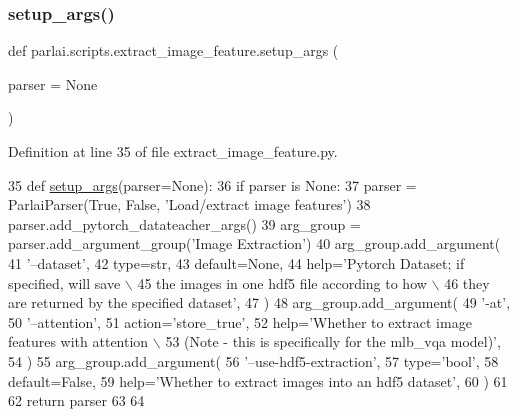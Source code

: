\subsubsection{\texorpdfstring{setup\+\_\+args()}{setup\_args()}}
{\footnotesize\ttfamily def parlai.\+scripts.\+extract\+\_\+image\+\_\+feature.\+setup\+\_\+args (\begin{DoxyParamCaption}\item[{}]{parser = {\ttfamily None} }\end{DoxyParamCaption})}



Definition at line 35 of file extract\+\_\+image\+\_\+feature.\+py.


\begin{DoxyCode}
35 \textcolor{keyword}{def }\hyperlink{namespaceparlai_1_1scripts_1_1extract__image__feature_ab634fcc65758e30deaf92980edcc20bd}{setup\_args}(parser=None):
36     \textcolor{keywordflow}{if} parser \textcolor{keywordflow}{is} \textcolor{keywordtype}{None}:
37         parser = ParlaiParser(\textcolor{keyword}{True}, \textcolor{keyword}{False}, \textcolor{stringliteral}{'Load/extract image features'})
38     parser.add\_pytorch\_datateacher\_args()
39     arg\_group = parser.add\_argument\_group(\textcolor{stringliteral}{'Image Extraction'})
40     arg\_group.add\_argument(
41         \textcolor{stringliteral}{'--dataset'},
42         type=str,
43         default=\textcolor{keywordtype}{None},
44         help=\textcolor{stringliteral}{'Pytorch Dataset; if specified, will save \(\backslash\)}
45 \textcolor{stringliteral}{                           the images in one hdf5 file according to how \(\backslash\)}
46 \textcolor{stringliteral}{                           they are returned by the specified dataset'},
47     )
48     arg\_group.add\_argument(
49         \textcolor{stringliteral}{'-at'},
50         \textcolor{stringliteral}{'--attention'},
51         action=\textcolor{stringliteral}{'store\_true'},
52         help=\textcolor{stringliteral}{'Whether to extract image features with attention \(\backslash\)}
53 \textcolor{stringliteral}{                           (Note - this is specifically for the mlb\_vqa model)'},
54     )
55     arg\_group.add\_argument(
56         \textcolor{stringliteral}{'--use-hdf5-extraction'},
57         type=\textcolor{stringliteral}{'bool'},
58         default=\textcolor{keyword}{False},
59         help=\textcolor{stringliteral}{'Whether to extract images into an hdf5 dataset'},
60     )
61 
62     \textcolor{keywordflow}{return} parser
63 
64 
\end{DoxyCode}
